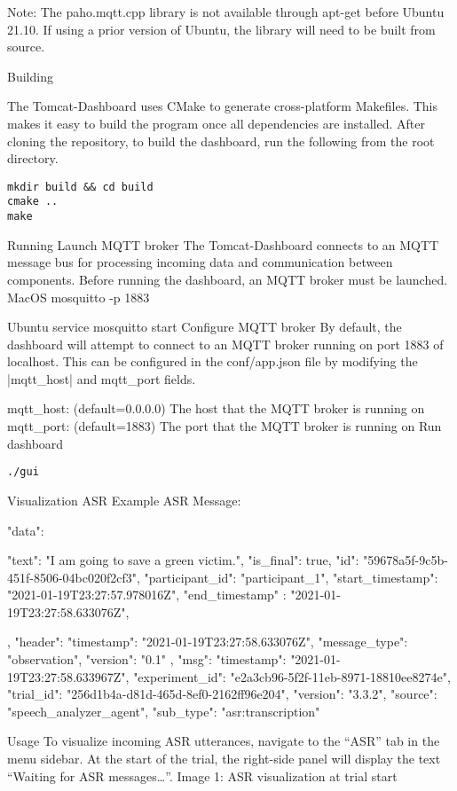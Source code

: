 Note: The paho.mqtt.cpp library  is not available through  apt-get before
Ubuntu 21.10. If using a prior version of Ubuntu, the library will need to be
built from source.

Building

The Tomcat-Dashboard uses CMake to generate cross-platform Makefiles. This
makes it easy to build the program once all dependencies are installed. After
cloning the repository, to build the dashboard, run the following from the root
directory.

\begin{lstlisting}
mkdir build && cd build
cmake ..
make
\end{lstlisting}


Running
Launch MQTT broker
The Tomcat-Dashboard connects to an MQTT message bus for processing incoming data and communication between components. Before running the dashboard, an MQTT broker must be launched.
MacOS
mosquitto -p 1883

Ubuntu
service mosquitto start
Configure MQTT broker
By default, the dashboard will attempt to connect to an MQTT broker running on
port 1883 of localhost. This can be configured in the conf/app.json file by
modifying the |mqtt\_host| and mqtt\_port fields.

mqtt_host: (default=0.0.0.0) The host that the MQTT broker is running on
mqtt_port: (default=1883) The port that the MQTT broker is running on
Run dashboard

\begin{lstlisting}
./gui
\end{lstlisting}



Visualization
ASR
Example ASR Message:
{
  "data": {
    "text": "I am going to save a green victim.",
    "is_final": true,
    "id": "59678a5f-9c5b-451f-8506-04bc020f2cf3",
    "participant_id": "participant_1",
    "start_timestamp": "2021-01-19T23:27:57.978016Z",
    "end_timestamp" : "2021-01-19T23:27:58.633076Z",

   },
  "header": {
    "timestamp": "2021-01-19T23:27:58.633076Z",
    "message_type": "observation",
    "version": "0.1"
  },
  "msg": {
    "timestamp": "2021-01-19T23:27:58.633967Z",
    "experiment_id": "e2a3cb96-5f2f-11eb-8971-18810ee8274e",
    "trial_id": "256d1b4a-d81d-465d-8ef0-2162ff96e204",
    "version": "3.3.2",
    "source": "speech_analyzer_agent",
    "sub_type": "asr:transcription"
  }
}


Usage
To visualize incoming ASR utterances, navigate to the “ASR” tab in the menu sidebar. At the start of the trial, the right-side panel will display the text “Waiting for ASR messages…”.
Image 1: ASR visualization at trial start

